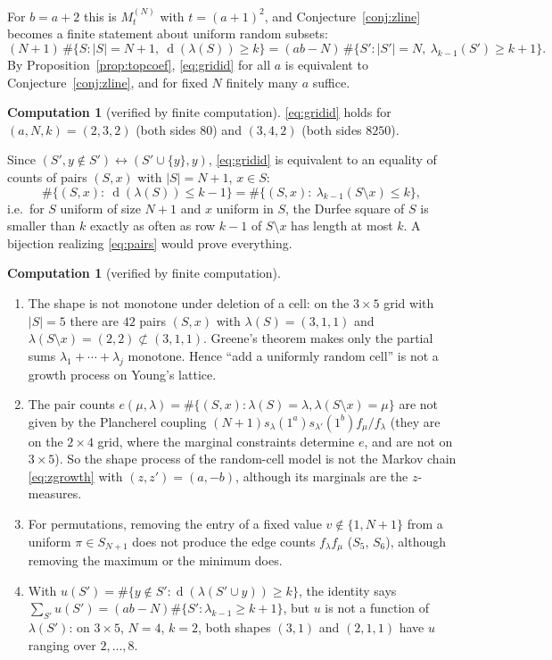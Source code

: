 \documentclass[11pt]{article}
\theoremstyle{definition}
\newtheorem{computation}[theorem]{Computation}
\theoremstyle{remark}
\DeclareMathOperator{\Durfee}{d}
\begin{document}
For $b=a+2$ this is $M^{(N)}_{t}$ with $t=(a+1)^2$, and Conjecture~\ref{conj:zline} becomes a finite statement about uniform random subsets:
\begin{equation}\label{eq:gridid}
(N+1)\,\#\{S:|S|=N+1,\ \Durfee(\lambda(S))\ge k\}=(ab-N)\,\#\{S':|S'|=N,\ \lambda_{k-1}(S')\ge k+1\}.
\end{equation}
By Proposition~\ref{prop:topcoef}, \eqref{eq:gridid} for all $a$ is equivalent to Conjecture~\ref{conj:zline}, and for fixed $N$ finitely many $a$ suffice.

\begin{computation}[verified by finite computation]
\eqref{eq:gridid} holds for $(a,N,k)=(2,3,2)$ (both sides $80$) and $(3,4,2)$ (both sides $8250$).
\end{computation}

Since $(S',y\notin S')\leftrightarrow(S'\cup\{y\},y)$, \eqref{eq:gridid} is equivalent to an equality of counts of pairs $(S,x)$ with $|S|=N+1$, $x\in S$:
\begin{equation}\label{eq:pairs}
\#\{(S,x):\ \Durfee(\lambda(S))\le k-1\}=\#\{(S,x):\ \lambda_{k-1}(S\setminus x)\le k\},
\end{equation}
i.e.\ for $S$ uniform of size $N+1$ and $x$ uniform in $S$, the Durfee square of $S$ is smaller than $k$ exactly as often as row $k-1$ of $S\setminus x$ has length at most $k$. A bijection realizing \eqref{eq:pairs} would prove everything.

\begin{computation}[verified by finite computation]\label{comp:gridobst}
\begin{enumerate}[label=(\roman*)]
\item The shape is not monotone under deletion of a cell: on the $3\times5$ grid with $|S|=5$ there are $42$ pairs $(S,x)$ with $\lambda(S)=(3,1,1)$ and $\lambda(S\setminus x)=(2,2)\not\subset(3,1,1)$. Greene's theorem makes only the partial sums $\lambda_1+\cdots+\lambda_j$ monotone. Hence ``add a uniformly random cell'' is not a growth process on Young's lattice.
\item The pair counts $e(\mu,\lambda)=\#\{(S,x):\lambda(S)=\lambda,\lambda(S\setminus x)=\mu\}$ are not given by the Plancherel coupling $(N+1)s_\lambda(1^a)s_{\lambda'}(1^b)f_\mu/f_\lambda$ (they are on the $2\times4$ grid, where the marginal constraints determine $e$, and are not on $3\times5$). So the shape process of the random-cell model is not the Markov chain \eqref{eq:zgrowth} with $(z,z')=(a,-b)$, although its marginals are the $z$-measures.
\item For permutations, removing the entry of a fixed value $v\notin\{1,N+1\}$ from a uniform $\pi\in S_{N+1}$ does not produce the edge counts $f_\lambda f_\mu$ ($S_5$, $S_6$), although removing the maximum or the minimum does.
\item With $u(S')=\#\{y\notin S':\Durfee(\lambda(S'\cup y))\ge k\}$, the identity says $\sum_{S'}u(S')=(ab-N)\#\{S':\lambda_{k-1}\ge k+1\}$, but $u$ is not a function of $\lambda(S')$: on $3\times5$, $N=4$, $k=2$, both shapes $(3,1)$ and $(2,1,1)$ have $u$ ranging over $2,\dots,8$.
\end{enumerate}
\end{computation}
\end{document}

